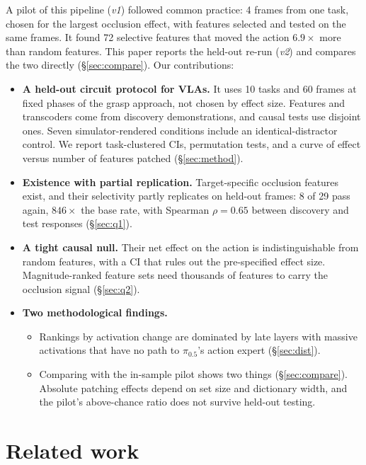 \documentclass{article} %
\newcommand{\pifive}{$\pi_{0.5}$}
\begin{document}
A pilot of this pipeline (\emph{v1}) followed common practice: 4 frames from one task, chosen for the largest occlusion effect, with features selected and tested on the same frames. It found 72 selective features that moved the action $6.9\times$ more than random features. This paper reports the held-out re-run (\emph{v2}) and compares the two directly (\S\ref{sec:compare}). Our contributions:
\begin{itemize}[leftmargin=*,itemsep=1pt,topsep=2pt]
  \item \textbf{A held-out circuit protocol for VLAs.} It uses 10 tasks and 60 frames at fixed phases of the grasp approach, not chosen by effect size. Features and transcoders come from discovery demonstrations, and causal tests use disjoint ones. Seven simulator-rendered conditions include an identical-distractor control. We report task-clustered CIs, permutation tests, and a curve of effect versus number of features patched (\S\ref{sec:method}).
  \item \textbf{Existence with partial replication.} Target-specific occlusion features exist, and their selectivity partly replicates on held-out frames: 8 of 29 pass again, $846\times$ the base rate, with Spearman $\rho{=}0.65$ between discovery and test responses (\S\ref{sec:q1}).
  \item \textbf{A tight causal null.} Their net effect on the action is indistinguishable from random features, with a CI that rules out the pre-specified effect size. Magnitude-ranked feature sets need thousands of features to carry the occlusion signal (\S\ref{sec:q2}).
  \item \textbf{Two methodological findings.}
  \begin{itemize}[leftmargin=*,itemsep=0pt,topsep=0pt]
    \item Rankings by activation change are dominated by late layers with massive activations \citep{sun2024massive} that have no path to \pifive{}'s action expert (\S\ref{sec:dist}).
    \item Comparing with the in-sample pilot shows two things (\S\ref{sec:compare}). Absolute patching effects depend on set size and dictionary width, and the pilot's above-chance ratio does not survive held-out testing.
  \end{itemize}
\end{itemize}

\section{Related work}
\label{sec:related}
\end{document}
